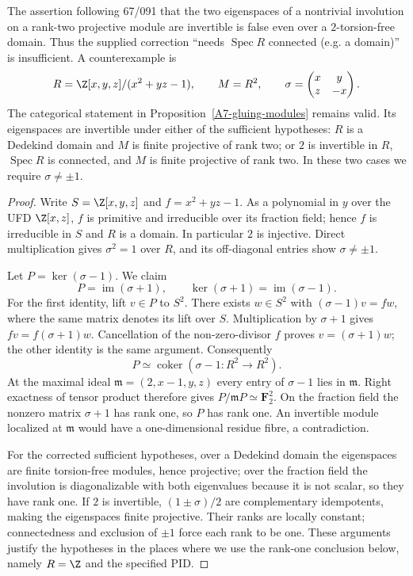 \begin{theorem}\label{A7-domain-counterexample}
The assertion following 67/091 that the two eigenspaces of a nontrivial involution on a rank-two projective module are invertible is false even over a $2$-torsion-free domain. Thus the supplied correction ``needs $\operatorname{Spec}R$ connected (e.g. a domain)'' is insufficient.
A counterexample is
\[
 R=\Z[x,y,z]/(x^2+yz-1),\qquad M=R^2,
 \qquad \sigma=\begin{pmatrix}x&y\\z&-x\end{pmatrix}.
\]
The categorical statement in Proposition~\ref{A7-gluing-modules} remains valid. Its eigenspaces are invertible under either of the sufficient hypotheses: $R$ is a Dedekind domain and $M$ is finite projective of rank two; or $2$ is invertible in $R$, $\operatorname{Spec}R$ is connected, and $M$ is finite projective of rank two. In these two cases we require $\sigma\ne\pm1$.
\end{theorem}
\begin{proof}
Write $S=\Z[x,y,z]$ and $f=x^2+yz-1$. As a polynomial in $y$ over the UFD $\Z[x,z]$, $f$ is primitive and irreducible over its fraction field; hence $f$ is irreducible in $S$ and $R$ is a domain. In particular $2$ is injective. Direct multiplication gives $\sigma^2=1$ over $R$, and its off-diagonal entries show $\sigma\ne\pm1$.

Let $P=\ker(\sigma-1)$. We claim
\[
 P=\operatorname{im}(\sigma+1),\qquad
 \ker(\sigma+1)=\operatorname{im}(\sigma-1).
\]
For the first identity, lift $v\in P$ to $S^2$. There exists $w\in S^2$ with $(\sigma-1)v=fw$, where the same matrix denotes its lift over $S$. Multiplication by $\sigma+1$ gives $fv=f(\sigma+1)w$. Cancellation of the non-zero-divisor $f$ proves $v=(\sigma+1)w$; the other identity is the same argument. Consequently
\[
 P\simeq\operatorname{coker}(\sigma-1:R^2\to R^2).
\]
At the maximal ideal $\mathfrak m=(2,x-1,y,z)$ every entry of $\sigma-1$ lies in $\mathfrak m$. Right exactness of tensor product therefore gives
$P/\mathfrak mP\simeq\mathbf F_2^2$. On the fraction field the nonzero matrix $\sigma+1$ has rank one, so $P$ has rank one. An invertible module localized at $\mathfrak m$ would have a one-dimensional residue fibre, a contradiction.

For the corrected sufficient hypotheses, over a Dedekind domain the eigenspaces are finite torsion-free modules, hence projective; over the fraction field the involution is diagonalizable with both eigenvalues because it is not scalar, so they have rank one. If $2$ is invertible, $(1\pm\sigma)/2$ are complementary idempotents, making the eigenspaces finite projective. Their ranks are locally constant; connectedness and exclusion of $\pm1$ force each rank to be one. These arguments justify the hypotheses in the places where we use the rank-one conclusion below, namely $R=\Z$ and the specified PID.
\end{proof}

